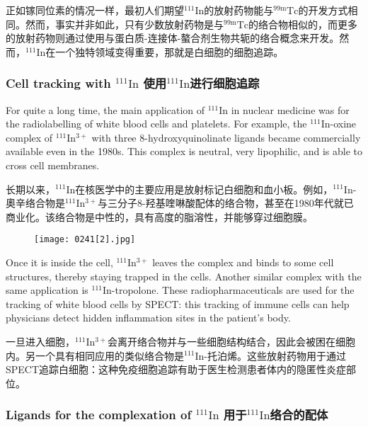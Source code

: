 \documentclass[dvipsnames, svgnames,a4paper,11pt]{article}
\begin{document}
正如镓同位素的情况一样，最初人们期望\(\mathrm{^{111}In}\)的放射药物能与\(\mathrm{^{99m}Tc}\)的开发方式相同。然而，事实并非如此，只有少数放射药物是与\(\mathrm{^{99m}Tc}\)的络合物相似的，而更多的放射药物则通过使用与蛋白质-连接体-螯合剂生物共轭的络合概念来开发。然而，\(\mathrm{^{111}In}\)在一个独特领域变得重要，那就是白细胞的细胞追踪。

\subsubsection{Cell tracking with \(\mathrm{^{111}In}\) 使用\(\mathrm{^{111}In}\)进行细胞追踪}  

For quite a long time, the main application of \(\mathrm{^{111}In}\) in nuclear medicine was for the radiolabelling of white blood cells and platelets. For example, the \(\mathrm{^{111}In}\)-oxine complex of \(\mathrm{^{111}In^{3+}}\) with three 8-hydroxyquinolinate ligands became commercially available even in the 1980s. This complex is neutral, very lipophilic, and is able to cross cell membranes.

长期以来，\(\mathrm{^{111}In}\)在核医学中的主要应用是放射标记白细胞和血小板。例如，\(\mathrm{^{111}In}\)-奧辛络合物是\(\mathrm{^{111}In^{3+}}\)与三分子8-羟基喹啉酸配体的络合物，甚至在1980年代就已商业化。该络合物是中性的，具有高度的脂溶性，并能够穿过细胞膜。

\begin{figure}[h]
	\centering
    \texttt{[image: 0241[2].jpg]}  
     \label{fig322}
\end{figure}

Once it is inside the cell, \(\mathrm{^{111}In^{3+}}\) leaves the complex and binds to some cell structures, thereby staying trapped in the cells. Another similar complex with the same application is \(\mathrm{^{111}In}\)-tropolone. These radiopharmaceuticals are used for the tracking of white blood cells by SPECT: this tracking of immune cells can help physicians detect hidden inflammation sites in the patient's body.

一旦进入细胞，\(\mathrm{^{111}In^{3+}}\)会离开络合物并与一些细胞结构结合，因此会被困在细胞内。另一个具有相同应用的类似络合物是\(\mathrm{^{111}In}\)-托泊烯。这些放射药物用于通过SPECT追踪白细胞：这种免疫细胞追踪有助于医生检测患者体内的隐匿性炎症部位。

\subsubsection{Ligands for the complexation of \(\mathrm{^{111}In}\) 用于\(\mathrm{^{111}In}\)络合的配体}  
\end{document}
